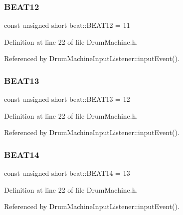 \mbox{\label{namespacebeat_ae84780c2b37cac562b4f9e7676d7a715}} 
\subsubsection{\texorpdfstring{B\+E\+A\+T12}{BEAT12}}
{\footnotesize\ttfamily const unsigned short beat\+::\+B\+E\+A\+T12 = 11}



Definition at line 22 of file Drum\+Machine.\+h.



Referenced by Drum\+Machine\+Input\+Listener\+::input\+Event().

\mbox{\label{namespacebeat_a0056cac49aa9cd40c0532068b40322fe}} 
\subsubsection{\texorpdfstring{B\+E\+A\+T13}{BEAT13}}
{\footnotesize\ttfamily const unsigned short beat\+::\+B\+E\+A\+T13 = 12}



Definition at line 22 of file Drum\+Machine.\+h.



Referenced by Drum\+Machine\+Input\+Listener\+::input\+Event().

\mbox{\label{namespacebeat_aa25c9d3e796af023ea86fc1181ff4732}} 
\subsubsection{\texorpdfstring{B\+E\+A\+T14}{BEAT14}}
{\footnotesize\ttfamily const unsigned short beat\+::\+B\+E\+A\+T14 = 13}



Definition at line 22 of file Drum\+Machine.\+h.



Referenced by Drum\+Machine\+Input\+Listener\+::input\+Event().

\mbox{\label{namespacebeat_a241a13409659dff75e5368358447fc73}} 
